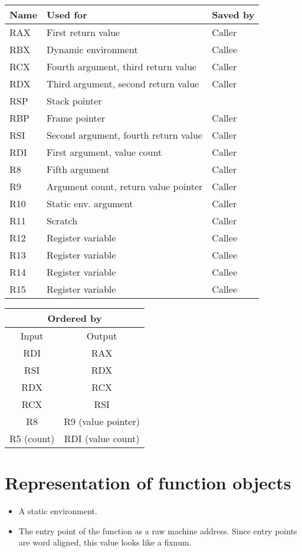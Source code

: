 \begin{tabular}{|l|l|l|}
\hline
Name & Used for & Saved by\\
\hline
\hline
RAX & First return value & Caller\\
RBX & Dynamic environment & Callee\\
RCX & Fourth argument, third return value & Caller \\
RDX & Third argument, second return value & Caller\\
RSP & Stack pointer &\\
RBP & Frame pointer & Caller\\
RSI & Second argument, fourth return value & Caller\\
RDI & First argument, value count & Caller\\
R8  & Fifth argument & Caller\\
R9  &  Argument count, return value pointer& Caller\\
R10 & Static env. argument & Caller\\
R11 & Scratch & Caller\\
R12 & Register variable & Callee\\
R13 & Register variable & Callee\\
R14 & Register variable & Callee\\
R15 & Register variable & Callee\\
\hline
\end{tabular}

\begin{tabular}{|c|c|}
\hline
  \multicolumn{2}{|c|}{Ordered by}\\
\hline
Input & Output \\ \hline
\hline
  RDI & RAX \\ \hline
  RSI & RDX \\ \hline
  RDX & RCX \\ \hline
  RCX & RSI \\ \hline
  R8  & R9 (value pointer) \\ \hline
  R5 (count) & RDI (value count) \\ \hline
\end{tabular}


\section{Representation of function objects}

\begin{itemize}
\item A static environment.
\item The entry point of the function as a raw machine address.  Since
  entry points are word aligned, this value looks like a fixnum.
\end{itemize}


